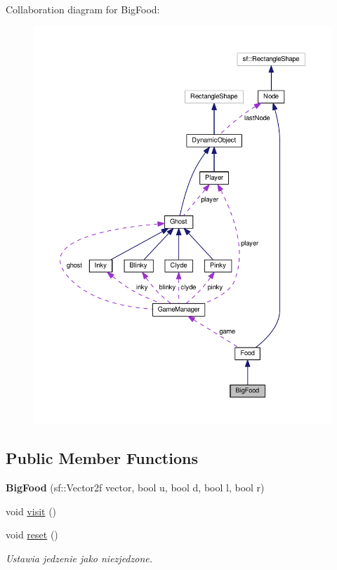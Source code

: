 Collaboration diagram for Big\+Food\+:\nopagebreak
\begin{figure}[H]
\begin{center}
\leavevmode
\includegraphics[width=350pt]{classBigFood__coll__graph}
\end{center}
\end{figure}
\subsection*{Public Member Functions}
\begin{DoxyCompactItemize}
\item 
\mbox{\label{classBigFood_ae90fad18345d1472c6c10dad2bda4dc4}} 
{\bfseries Big\+Food} (sf\+::\+Vector2f vector, bool u, bool d, bool l, bool r)
\item 
void \hyperlink{classBigFood_ac463d12e08fe29b7414520c50856b450}{visit} ()
\item 
\mbox{\label{classBigFood_acc693365e1ae8051b797c6954a2e4e37}} 
void \hyperlink{classBigFood_acc693365e1ae8051b797c6954a2e4e37}{reset} ()
\begin{DoxyCompactList}\small\item\em Ustawia jedzenie jako niezjedzone. \end{DoxyCompactList}\end{DoxyCompactItemize}
